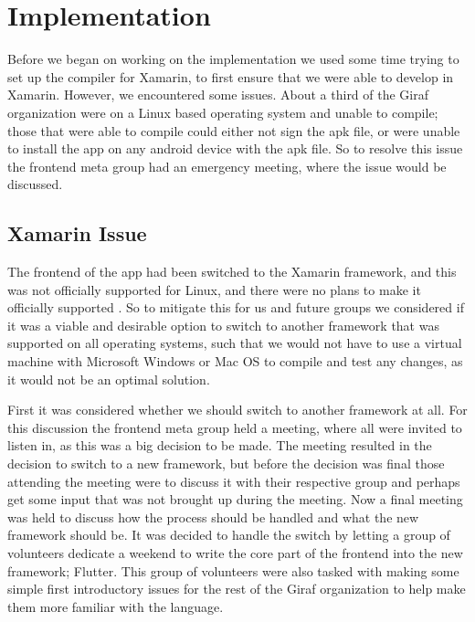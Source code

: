 \section{Implementation}
Before we began on working on the implementation we used some time trying to set up the compiler for Xamarin, to first ensure that we were able to develop in Xamarin.
However, we encountered some issues.
About a third of the Giraf organization were on a Linux based operating system and unable to compile; those that were able to compile could either not sign the apk file, or were unable to install the app on any android device with the apk file.
So to resolve this issue the frontend meta group had an emergency meeting, where the issue would be discussed.

\subsection{Xamarin Issue}
The frontend of the app had been switched to the Xamarin framework, and this was not officially supported for Linux, and there were no plans to make it officially supported \cite{xamarinSupport} \cite{xamarinSupport2}.
So to mitigate this for us and future groups we considered if it was a viable and desirable option to switch to another framework that was supported on all operating systems, such that we would not have to use a virtual machine with Microsoft Windows or Mac OS to compile and test any changes, as it would not be an optimal solution.

First it was considered whether we should switch to another framework at all.
For this discussion the frontend meta group held a meeting, where all were invited to listen in, as this was a big decision to be made.
The meeting resulted in the decision to switch to a new framework, but before the decision was final those attending the meeting were to discuss it with their respective group and perhaps get some input that was not brought up during the meeting.
Now a final meeting was held to discuss how the process should be handled and what the new framework should be.
It was decided to handle the switch by letting a group of volunteers dedicate a weekend to write the core part of the frontend into the new framework; Flutter. 
This group of volunteers were also tasked with making some simple first introductory issues for the rest of the Giraf organization to help make them more familiar with the language.

